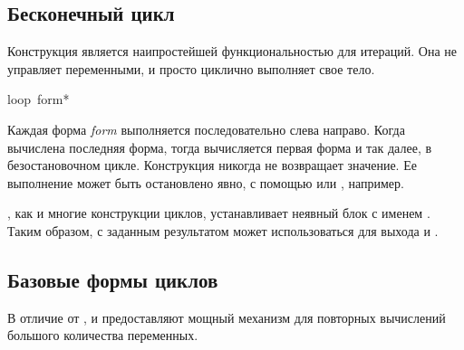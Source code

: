 \subsection{Бесконечный цикл}

Конструкция  является наипростейшей функциональностью для итераций.
Она не управляет переменными, и просто циклично выполняет свое тело.

\begin{defmac}
loop {\,form}*

Каждая форма \emph{form} выполняется последовательно слева направо.
Когда вычислена последняя форма, тогда вычисляется первая форма и так далее,
в безостановочном цикле.
Конструкция  никогда не возвращает значение. Ее выполнение может быть
остановлено явно, с помощью  или , например.

, как и многие конструкции циклов, устанавливает неявный блок с именем
{\nil}.
Таким образом,  с заданным результатом может использоваться для
выхода и .
\end{defmac}

\subsection{Базовые формы циклов}

В отличие от ,  и  предоставляют мощный механизм для
повторных вычислений большого количества переменных. 


